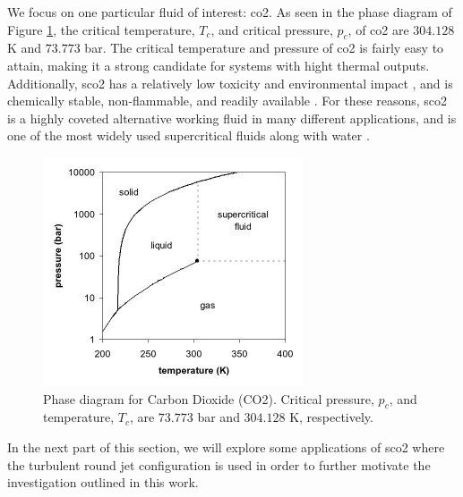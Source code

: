 We focus on one particular fluid of interest: \gls{co2}. As seen in the phase diagram of Figure \ref{phase_diagram}, the critical temperature, $T_c$, and critical pressure, $p_c$, of \gls{co2} are $304.128 $ K and $73.773$ bar. The critical temperature and pressure of \gls{co2} is fairly easy to attain, making it a strong candidate for systems with hight thermal outputs. Additionally, \gls{sco2} has a relatively low toxicity and environmental impact \cite{}, and is chemically stable, non-flammable, and readily available \cite{}. For these reasons, \gls{sco2} is a highly coveted alternative working fluid in many different applications, and is one of the most widely used supercritical fluids along with water \cite{SCF2}. 

\begin{figure}[h!]
\begin{center}
\includegraphics[scale=.75]{figures/co2_phase_diagram}
\end{center}
\caption{Phase diagram for Carbon Dioxide (CO2). Critical pressure, $p_c$, and temperature, $T_c$, are $73.773$ bar and $304.128$ K, respectively.}
\label{phase_diagram}
\end{figure}

In the next part of this section, we will explore some applications of \gls{sco2} where the turbulent round jet configuration is used in order to further motivate the investigation outlined in this work. 

